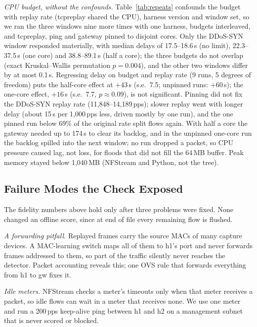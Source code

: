 \emph{CPU budget, without the confounds.} Table~\ref{tab:repeats} confounds the budget with replay rate (tcpreplay shared the CPU), harness version and window set, so we ran the three windows nine more times with one harness, budgets interleaved, and tcpreplay, ping and gateway pinned to disjoint cores. Only the DDoS-SYN window responded materially, with median delays of 17.5--18.6\,s (no limit), 22.3--37.5\,s (one core) and 38.8--89.1\,s (half a core); the three budgets do not overlap (exact Kruskal--Wallis permutation $p=0.004$), and the other two windows differ by at most 0.1\,s. Regressing delay on budget and replay rate (9 runs, 5 degrees of freedom) puts the half-core effect at $+43$\,s (s.e.\ 7.5; unpinned runs: $+60$\,s); the one-core effect, $+16$\,s (s.e.\ 7.7, $p\approx0.09$), is not significant. Pinning did not fix the DDoS-SYN replay rate (11,848--14,189\,pps); slower replay went with longer delay (about 15\,s per 1,000\,pps less, driven mostly by one run), and the one pinned run below 69\% of the original rate split flows again. With half a core the gateway needed up to 174\,s to clear its backlog, and in the unpinned one-core run the backlog spilled into the next window; no run dropped a packet, so CPU pressure caused lag, not loss, for floods that did not fill the 64\,MB buffer. Peak memory stayed below 1,040\,MB (NFStream and Python, not the tree).

\subsection{Failure Modes the Check Exposed}\label{sec:defect}

The fidelity numbers above hold only after three problems were fixed. None changed an offline score, since at end of file every remaining flow is flushed.

\emph{A forwarding pitfall.} Replayed frames carry the source MACs of many capture devices. A MAC-learning switch maps all of them to h1's port and never forwards frames addressed to them, so part of the traffic silently never reaches the detector. Packet accounting reveals this; one OVS rule that forwards everything from h1 to gw fixes it.

\emph{Idle meters.} NFStream checks a meter's timeouts only when that meter receives a packet, so idle flows can wait in a meter that receives none. We use one meter and run a 200\,pps keep-alive ping between h1 and h2 on a management subnet that is never scored or blocked.

